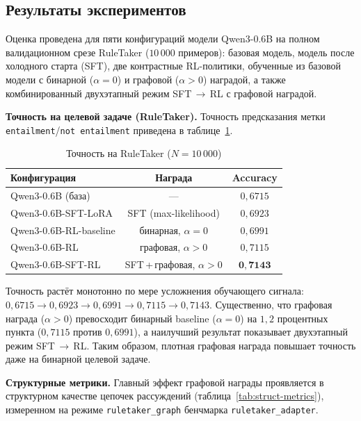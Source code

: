 \subsection{Результаты экспериментов}
\label{subsec:impl-results}

Оценка проведена для пяти конфигураций модели Qwen3-0.6B на полном валидационном срезе RuleTaker ($10\,000$ примеров): базовая модель, модель после холодного старта (SFT), две контрастные RL-политики, обученные из базовой модели с бинарной ($\alpha=0$) и графовой ($\alpha>0$) наградой, а также комбинированный двухэтапный режим SFT\,$\to$\,RL с графовой наградой.

\textbf{Точность на целевой задаче (RuleTaker).} Точность предсказания метки \texttt{entailment}/\texttt{not entailment} приведена в таблице~\ref{tab:ruletaker-acc}.

\begin{table}[htbp]
\centering
\caption{Точность на RuleTaker ($N=10\,000$)}
\label{tab:ruletaker-acc}
\begin{tabular}{|l|c|c|}
\hline
\textbf{Конфигурация} & \textbf{Награда} & \textbf{Accuracy} \\
\hline
Qwen3-0.6B (база)        & ---                    & $0{,}6715$ \\
\hline
Qwen3-0.6B-SFT-LoRA      & SFT (max-likelihood)   & $0{,}6923$ \\
\hline
Qwen3-0.6B-RL-baseline   & бинарная, $\alpha=0$   & $0{,}6991$ \\
\hline
Qwen3-0.6B-RL            & графовая, $\alpha>0$   & $0{,}7115$ \\
\hline
Qwen3-0.6B-SFT-RL        & SFT\,+\,графовая, $\alpha>0$ & $\mathbf{0{,}7143}$ \\
\hline
\end{tabular}
\end{table}

Точность растёт монотонно по мере усложнения обучающего сигнала: $0{,}6715 \to 0{,}6923 \to 0{,}6991 \to 0{,}7115 \to 0{,}7143$. Существенно, что графовая награда ($\alpha>0$) превосходит бинарный baseline ($\alpha=0$) на $1{,}2$ процентных пункта ($0{,}7115$ против $0{,}6991$), а наилучший результат показывает двухэтапный режим SFT\,$\to$\,RL. Таким образом, плотная графовая награда повышает точность даже на бинарной целевой задаче.

\textbf{Структурные метрики.} Главный эффект графовой награды проявляется в структурном качестве цепочек рассуждений (таблица~\ref{tab:struct-metrics}), измеренном на режиме \texttt{ruletaker\_graph} бенчмарка \texttt{ruletaker\_adapter}.


